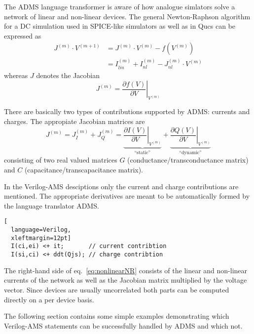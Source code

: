 The ADMS language transformer is aware of how analogue simlators solve
a network of linear and non-linear devices.  The general
Newton-Raphson algorithm for a DC simulation used in SPICE-like
simulators as well as in Qucs can be expressed as
\begin{equation}
\begin{split}
\label{eq:nonlinearNR}
J^{(m)}\cdot V^{(m+1)} &= J^{(m)}\cdot V^{(m)} - f\left(V^{(m)}\right)\\
&= I_{lin}^{(m)} + I_{nl}^{(m)} - J_{nl}^{(m)}\cdot V^{(m)}
\end{split}
\end{equation}
whereas $J$ denotes the Jacobian
\begin{equation}
J^{(m)} = \left.\dfrac{\partial f\left(V\right)}{\partial V}\right|_{V^{(m)}}
\end{equation}

There are basically two types of contributions supported by ADMS:
currents and charges.  The appropiate Jacobian matrices are
\begin{equation}
J^{(m)} = J_I^{(m)} + J_Q^{(m)} = \underbrace{\left.\dfrac{\partial I\left(V\right)}{\partial V}\right|_{V^{(m)}}}_{\textrm{``static''}} + \underbrace{\left.\dfrac{\partial Q\left(V\right)}{\partial V}\right|_{V^{(m)}}}_{\textrm{``dynamic''}}
\end{equation}
consisting of two real valued matrices $G$
(conductance/transconductance matrix) and $C$
(capacitance/transcapacitance matrix).

\addvspace{12pt}

In the Verilog-AMS desciptions only the current and charge
contributions are mentioned.  The appropriate derivatives are meant to
be automatically formed by the language translator ADMS.
\begin{lstlisting}[
  language=Verilog,
  xleftmargin=12pt]
  I(ci,ei) <+ it;       // current contribtion
  I(si,ci) <+ ddt(Qjs); // charge contribtion
\end{lstlisting}

The right-hand side of eq.~\eqref{eq:nonlinearNR} consists of the
linear and non-linear currents of the network as well as the Jacobian
matrix multiplied by the voltage vector.  Since devices are usually
uncorrelated both parts can be computed directly on a per device
basis.


The following section contains some simple examples demonstrating
which Verilog-AMS statements can be successfully handled by ADMS and
which not.

